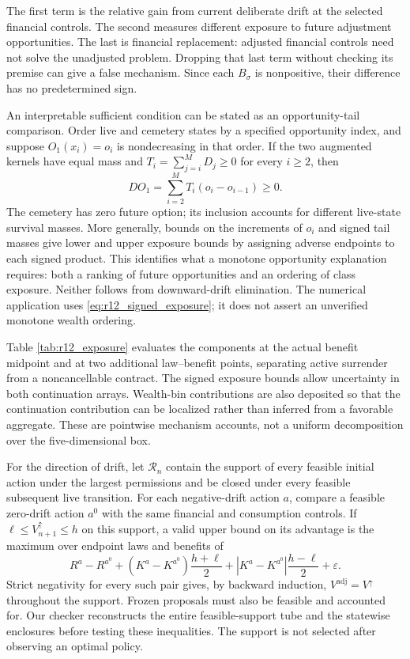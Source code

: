 The first term is the relative gain from current deliberate drift at the selected financial controls. The second measures different exposure to future adjustment opportunities. The last is financial replacement: adjusted financial controls need not solve the unadjusted problem. Dropping that last term without checking its premise can give a false mechanism. Since each $B_\sigma$ is nonpositive, their difference has no predetermined sign.

An interpretable sufficient condition can be stated as an opportunity-tail comparison. Order live and cemetery states by a specified opportunity index, and suppose $O_1(x_i)=o_i$ is nondecreasing in that order. If the two augmented kernels have equal mass and $T_i=\sum_{j=i}^M D_j\geq0$ for every $i\geq2$, then
\begin{equation}
 DO_1=\sum_{i=2}^M T_i(o_i-o_{i-1})\geq0.
 \label{eq:r12_tail}
\end{equation}
The cemetery has zero future option; its inclusion accounts for different live-state survival masses. More generally, bounds on the increments of $o_i$ and signed tail masses give lower and upper exposure bounds by assigning adverse endpoints to each signed product. This identifies what a monotone opportunity explanation requires: both a ranking of future opportunities and an ordering of class exposure. Neither follows from downward-drift elimination. The numerical application uses \eqref{eq:r12_signed_exposure}; it does not assert an unverified monotone wealth ordering.



Table \ref{tab:r12_exposure} evaluates the components at the actual benefit midpoint and at two additional law--benefit points, separating active surrender from a noncancellable contract. The signed exposure bounds allow uncertainty in both continuation arrays. Wealth-bin contributions are also deposited so that the continuation contribution can be localized rather than inferred from a favorable aggregate. These are pointwise mechanism accounts, not a uniform decomposition over the five-dimensional box.

For the direction of drift, let $\mathcal R_n$ contain the support of every feasible initial action under the largest permissions and be closed under every feasible subsequent live transition. For each negative-drift action $a$, compare a feasible zero-drift action $a^0$ with the same financial and consumption controls. If $\ell\leq V^\uparrow_{n+1}\leq h$ on this support, a valid upper bound on its advantage is the maximum over endpoint laws and benefits of
\begin{equation}
 R^a-R^{a^0}+(K^a-K^{a^0})\frac{h+\ell}{2}
       +|K^a-K^{a^0}|\frac{h-\ell}{2}+\varepsilon.
 \label{eq:r12_transport}
\end{equation}
Strict negativity for every such pair gives, by backward induction, $V^{\mathrm{adj}}=V^\uparrow$ throughout the support. Frozen proposals must also be feasible and accounted for. Our checker reconstructs the entire feasible-support tube and the statewise enclosures before testing these inequalities. The support is not selected after observing an optimal policy.


